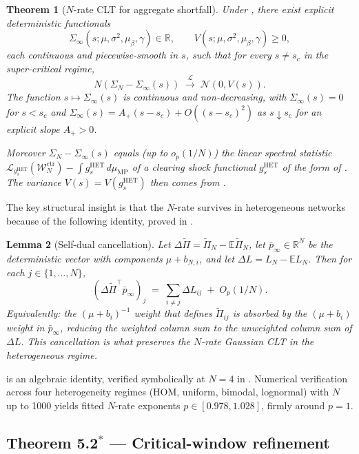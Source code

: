 \documentclass[11pt,a4paper]{article}
\newtheorem{theorem}{Theorem}[section]
\newtheorem{lemma}[theorem]{Lemma}
\theoremstyle{definition}
\newcommand{\WN}{\mathcal{W}_N^{\mathrm{ctr}}}
\newcommand{\SigmaN}{\Sigma_N}
\newcommand{\SigmaInf}{\Sigma_\infty}
\newcommand{\muMP}{\mu_{\mathrm{MP}}}
\newcommand{\Lcal}{\mathcal{L}}
\newcommand{\DPi}{\Delta\widetilde{\Pi}}
\newcommand{\pbarinf}{{\bar p}_{\infty}}
\newcommand{\HET}{\mathrm{HET}}
\begin{document}
\begin{theorem}[$N$-rate CLT for aggregate shortfall]
\label{thm:thm52}
Under , there exist explicit
deterministic functionals
\[
\SigmaInf(s;\mu,\sigma^2,\mu_\beta,\gamma)\in\mathbb{R},
\qquad
V(s;\mu,\sigma^2,\mu_\beta,\gamma)\geq 0,
\]
each continuous and piecewise-smooth in $s$, such that for every $s\neq s_c$
in the super-critical regime,
\[
\boxed{\;N\!\left(\SigmaN - \SigmaInf(s)\right)\;\xrightarrow{\mathcal L}\;
\mathcal N\!\left(0,V(s)\right).\;}
\]
The function $s\mapsto\SigmaInf(s)$ is continuous and non-decreasing, with
$\SigmaInf(s) = 0$ for $s<s_c$ and $\SigmaInf(s) = A_+(s-s_c)+O((s-s_c)^2)$
as $s\downarrow s_c$ for an explicit slope $A_+>0$.

Moreover $\SigmaN-\SigmaInf(s)$ equals (up to $o_p(1/N)$) the linear spectral
statistic $\Lcal_{g_s^{\HET}}(\WN) - \int g_s^{\HET}\,d\muMP$ of a clearing
shock functional $g_s^{\HET}$ of the form of . The
variance $V(s) = V(g_s^{\HET})$ then comes from .
\end{theorem}

The key structural insight is that the $N$-rate survives in heterogeneous
networks because of the following identity, proved in .

\begin{lemma}[Self-dual cancellation]
\label{lem:self-dual}
Let $\DPi = \widetilde\Pi_N - \mathbb E\widetilde\Pi_N$, let
$\pbarinf\in\mathbb{R}^N$ be the deterministic vector with components $\mu+b_{N,i}$,
and let $\Delta L = L_N - \mathbb E L_N$. Then for each $j\in\{1,\dots,N\}$,
\[
(\DPi^\top\pbarinf)_j\;=\;\sum_{i\neq j}\Delta L_{ij}\;+\;O_p(1/N).
\]
Equivalently: the $(\mu+b_i)^{-1}$ weight that defines $\widetilde\Pi_{ij}$
is absorbed by the $(\mu+b_i)$ weight in $\pbarinf$, reducing the weighted
column sum to the unweighted column sum of $\Delta L$. This cancellation is
what preserves the $N$-rate Gaussian CLT in the heterogeneous regime.
\end{lemma}

 is an algebraic identity, verified symbolically at
$N = 4$ in . Numerical verification across four heterogeneity
regimes (HOM, uniform, bimodal, lognormal) with $N$ up to 1000 yields fitted
$N$-rate exponents $p\in[0.978,1.028]$, firmly around $p = 1$.

\subsection{Theorem 5.2$^\ast$ --- Critical-window refinement}
\end{document}
